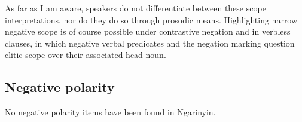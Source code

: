\documentclass[output=paper,colorlinks,citecolor=brown]{langscibook}
\begin{document}
As far as I am aware, speakers do not differentiate between these scope interpretations, nor do they do so through prosodic means. Highlighting narrow negative scope is of course possible under contrastive negation and in verbless clauses, in which negative verbal predicates and the negation marking question clitic scope over their associated head noun.

\subsection{Negative polarity}
No negative polarity items have been found in Ngarinyin.
\end{document}
